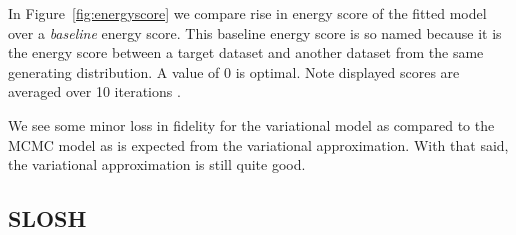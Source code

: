     In Figure~\ref{fig:energyscore} we compare rise in energy score of the fitted
    model over a \emph{baseline} energy score.  This baseline energy score is so
    named because it is the energy score between a target dataset and another
    dataset from the same generating distribution.  A value of 0 is optimal.
      Note displayed scores are 
    averaged over 10 iterations .
    
    We see some minor loss in fidelity for the variational model as compared to 
    the MCMC model as is expected from the variational approximation.  With that
    said, the variational approximation is still quite good.

\subsection{SLOSH}


